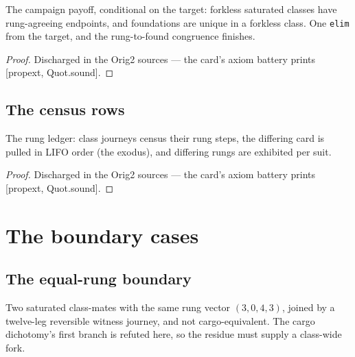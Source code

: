 \begin{theorem}\label{thm:ceiling}
\leanok
{}
The campaign payoff, conditional on the target: forkless
saturated classes have rung-agreeing endpoints, and foundations
are unique in a forkless class.  One \texttt{elim} from the
target, and the rung-to-found congruence finishes.
\end{theorem}

\begin{proof}
\leanok
Discharged in the Orig2 sources --- the card's axiom battery prints [propext, Quot.sound].
\end{proof}

\section{The census rows}

\begin{theorem}\label{thm:rungCensus}
\leanok
{}
The rung ledger: class journeys census their rung steps, the
differing card is pulled in LIFO order (the exodus), and
differing rungs are exhibited per suit.
\end{theorem}

\begin{proof}
\leanok
Discharged in the Orig2 sources --- the card's axiom battery prints [propext, Quot.sound].
\end{proof}

\chapter{The boundary cases}
\label{chap:boundary}

\section{The equal-rung boundary}

\begin{theorem}\label{thm:vcBoundary}
\leanok
{}
Two saturated class-mates with the same rung vector
$(3,0,4,3)$, joined by a twelve-leg reversible witness journey,
and not cargo-equivalent.  The cargo dichotomy's first branch is
refuted here, so the residue must supply a class-wide fork.
\end{theorem}

